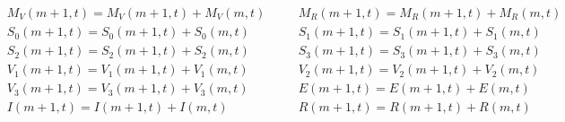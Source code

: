 \documentclass[a4paper,11pt] {scrartcl}
\begin{document}
\begin{align*}
&{M_V}(m+1,t) = {M_V}(m+1,t)+{M_V}(m,t)& \quad
&{M_R}(m+1,t) = {M_R}(m+1,t)+{M_R}(m,t)\\
&{S_0}(m+1,t) = {S_0}(m+1,t)+{S_0}(m,t)& \quad
&{S_1}(m+1,t) = {S_1}(m+1,t)+{S_1}(m,t) \\
&{S_2}(m+1,t) = {S_2}(m+1,t)+{S_2}(m,t)& \quad
&{S_3}(m+1,t) = {S_3}(m+1,t)+{S_3}(m,t)\\
&{V_1}(m+1,t) = {V_1}(m+1,t)+{V_1}(m,t)& \quad
&{V_2}(m+1,t) = {V_2}(m+1,t)+{V_2}(m,t) \\
&{V_3}(m+1,t) = {V_3}(m+1,t)+{V_3}(m,t)& \quad
&{E}(m+1,t) = {E}(m+1,t)+{E}(m,t) \\
&{I}(m+1,t) = {I}(m+1,t)+{I}(m,t) & \quad
&{R}(m+1,t) = {R}(m+1,t)+{R}(m,t)
\end{align*}

\newpage
\end{document}
